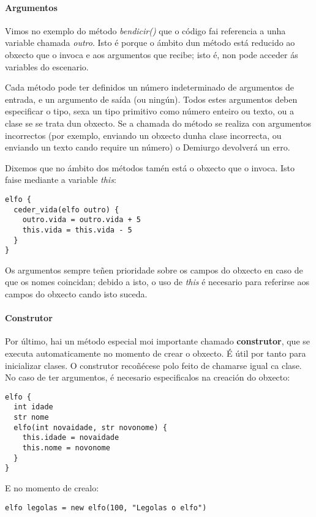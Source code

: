 \paragraph{Argumentos}
Vimos no exemplo do método {\it bendicir()} que o código fai referencia a unha
variable chamada {\it outro}. Isto é porque o ámbito dun método está reducido ao
obxecto que o invoca e aos argumentos que recibe; isto é, non pode acceder ás
variables do escenario.
\par
Cada método pode ter definidos un número indeterminado de argumentos de entrada,
e un argumento de saída (ou ningún). Todos estes argumentos deben especificar o
tipo, sexa un tipo primitivo como número enteiro ou texto, ou a clase se se
trata dun obxecto. Se a chamada do método se realiza con argumentos incorrectos
(por exemplo, enviando un obxecto dunha clase incorrecta, ou enviando un texto
cando require un número) o Demiurgo devolverá un erro.
\par
Dixemos que no ámbito dos métodos tamén está o obxecto que o invoca. Isto
faise mediante a variable {\it this}:
\begin{lstlisting}
elfo {
  ceder_vida(elfo outro) {
    outro.vida = outro.vida + 5
    this.vida = this.vida - 5
  }
}
\end{lstlisting}
\par
Os argumentos sempre teñen prioridade sobre os campos do obxecto en caso de que
os nomes coincidan; debido a isto, o uso de {\it this} é necesario para
referirse aos campos do obxecto cando isto suceda.

\paragraph{Construtor}
\label{subsubsec:construtor}
Por último, hai un método especial moi importante chamado {\bf construtor}, que
se executa automaticamente no momento de crear o obxecto. É útil por tanto para
inicializar clases. O construtor recoñécese polo feito de chamarse igual ca
clase. No caso de ter argumentos, é necesario especificalos na creación do
obxecto:
\begin{lstlisting}
elfo {
  int idade
  str nome
  elfo(int novaidade, str novonome) {
    this.idade = novaidade
    this.nome = novonome
  }
}
\end{lstlisting}
\par E no momento de crealo:
\begin{lstlisting}
elfo legolas = new elfo(100, "Legolas o elfo")
\end{lstlisting}


